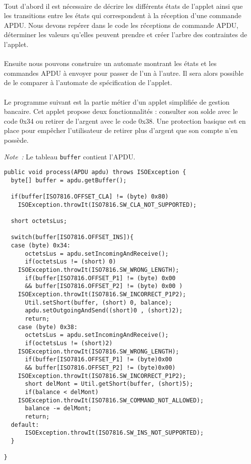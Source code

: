 \paragraph{}
Tout d’abord il est nécessaire de décrire les différents états de l’applet ainsi que les transitions entre les états qui correspondent à la réception d’une commande \gls{APDU}. Nous devons repérer dans le code les réceptions de commande \gls{APDU}, déterminer les valeurs qu’elles peuvent prendre et créer l’arbre des contraintes de l’applet.
\paragraph{}
Ensuite nous pouvons construire un automate montrant les états et les commandes \gls{APDU} à envoyer pour passer de l’un à l’autre. Il sera alors possible de le comparer à l’automate de spécification de l’applet.

\paragraph{}
Le programme suivant est la partie métier d’un applet simplifiée de gestion bancaire. Cet applet propose deux fonctionnalités : consulter son solde avec le code 0x34 ou retirer de l’argent avec le code 0x38. Une protection basique est en place pour empêcher l’utilisateur de retirer plus d’argent que son compte n’en possède.

\textit{Note~:} Le tableau \verb|buffer| contient l'\gls{APDU}.

\begin{verbatim}
public void process(APDU apdu) throws ISOException {
  byte[] buffer = apdu.getBuffer();
      
  if(buffer[ISO7816.OFFSET_CLA] != (byte) 0x80)
    ISOException.throwIt(ISO7816.SW_CLA_NOT_SUPPORTED);
      
  short octetsLus;
      
  switch(buffer[ISO7816.OFFSET_INS]){
  case (byte) 0x34:
      octetsLus = apdu.setIncomingAndReceive();
      if(octetsLus != (short) 0)
	ISOException.throwIt(ISO7816.SW_WRONG_LENGTH);
      if(buffer[ISO7816.OFFSET_P1] != (byte) 0x00 
	  && buffer[ISO7816.OFFSET_P2] != (byte) 0x00 )
	ISOException.throwIt(ISO7816.SW_INCORRECT_P1P2);
      Util.setShort(buffer, (short) 0, balance);
      apdu.setOutgoingAndSend((short)0 , (short)2);
      return;
    case (byte) 0x38:
      octetsLus = apdu.setIncomingAndReceive();
      if(octetsLus != (short)2)
	ISOException.throwIt(ISO7816.SW_WRONG_LENGTH);
      if(buffer[ISO7816.OFFSET_P1] != (byte)0x00 
	  && buffer[ISO7816.OFFSET_P2] != (byte)0x00)
	ISOException.throwIt(ISO7816.SW_INCORRECT_P1P2);
      short delMont = Util.getShort(buffer, (short)5);
      if(balance < delMont)
	ISOException.throwIt(ISO7816.SW_COMMAND_NOT_ALLOWED);
      balance -= delMont;
      return;
  default:
      ISOException.throwIt(ISO7816.SW_INS_NOT_SUPPORTED);
  }

}
\end{verbatim}

